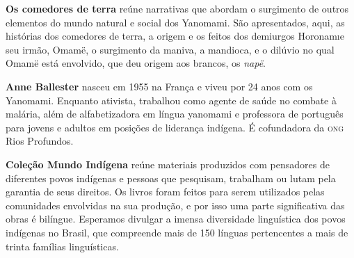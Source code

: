 \textbf{Os comedores de terra} reúne narrativas que abordam o surgimento de outros elementos do mundo natural e social dos Yanomami. São apresentados, aqui, as histórias dos comedores de terra, a origem e os feitos dos demiurgos Horonam\i e seu irmão, Omamë, o surgimento da maniva, a mandioca, e o dilúvio no qual Omamë está envolvido, que deu origem aos brancos, os \textit{napë}.

\textbf{Anne Ballester} nasceu em 1955 na França e viveu por 24 anos com os Yanomami. Enquanto ativista, trabalhou como agente de saúde no combate à malária, além de alfabetizadora em língua yanomami e professora de português para jovens e adultos em posições de liderança indígena. É cofundadora da \textsc{ong} Rios Profundos. 

\textbf{Coleção Mundo Indígena} reúne materiais produzidos com pensadores de diferentes povos indígenas e pessoas que pesquisam, trabalham ou lutam pela garantia de seus direitos. Os livros foram feitos para serem utilizados pelas comunidades envolvidas na sua produção, e por isso uma parte significativa das obras é bilíngue. Esperamos divulgar a imensa diversidade linguística dos povos indígenas no Brasil, que compreende mais de 150 línguas pertencentes a mais de trinta famílias linguísticas.



